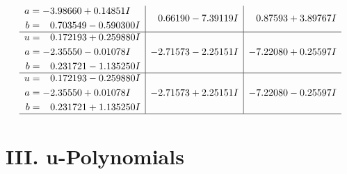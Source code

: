 \documentclass[1p]{elsarticle_modified}
\theoremstyle{definition}
\begin{document}
$$\begin{array}{c|c|c}
\begin{aligned}
a &= -3.98660 + 0.14851 I \\
b &= \phantom{-}0.703549 - 0.590300 I\end{aligned}
 & \phantom{-}0.66190 - 7.39119 I & \phantom{-}0.87593 + 3.89767 I \\ \hline\begin{aligned}
u &= \phantom{-}0.172193 + 0.259880 I \\
a &= -2.35550 - 0.01078 I \\
b &= \phantom{-}0.231721 - 1.135250 I\end{aligned}
 & -2.71573 - 2.25151 I & -7.22080 + 0.25597 I \\ \hline\begin{aligned}
u &= \phantom{-}0.172193 - 0.259880 I \\
a &= -2.35550 + 0.01078 I \\
b &= \phantom{-}0.231721 + 1.135250 I\end{aligned}
 & -2.71573 + 2.25151 I & -7.22080 - 0.25597 I\\
 \hline 
 \end{array}$$\newpage
\newpage\renewcommand{\arraystretch}{1}
\centering \section*{ III. u-Polynomials}
\end{document}
